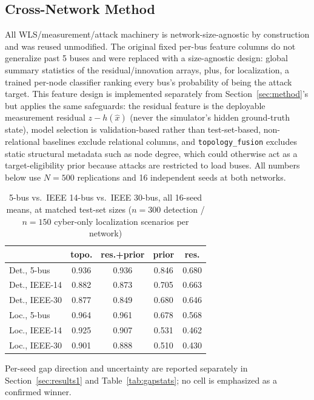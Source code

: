 \documentclass[conference]{IEEEtran}
\begin{document}
\subsection{Cross-Network Method}
All WLS/measurement/attack machinery is network-size-agnostic by construction and was reused unmodified. The original fixed per-bus feature columns do not generalize past 5 buses and were replaced with a size-agnostic design: global summary statistics of the residual/innovation arrays, plus, for localization, a trained per-node classifier ranking every bus's probability of being the attack target. This feature design is implemented separately from Section~\ref{sec:method}'s but applies the same safeguards: the residual feature is the deployable measurement residual $z - h(\hat{x})$ (never the simulator's hidden ground-truth state), model selection is validation-based rather than test-set-based, non-relational baselines exclude relational columns, and \texttt{topology\_fusion} excludes static structural metadata such as node degree, which could otherwise act as a target-eligibility prior because attacks are restricted to load buses. All numbers below use $N{=}500$ replications and 16 independent seeds at both networks.

\begin{table}[t]
\centering
\caption{5-bus vs.\ IEEE 14-bus vs.\ IEEE 30-bus, all 16-seed means, at matched test-set sizes ($n{=}300$ detection / $n{=}150$ cyber-only localization scenarios per network)}
\label{tab:scale}
\footnotesize
\begin{tabular}{@{}lcccc@{}}
\toprule
 & topo. & res.+prior & prior & res. \\
\midrule
Det., 5-bus & 0.936 & 0.936 & 0.846 & 0.680 \\
Det., IEEE-14 & 0.882 & 0.873 & 0.705 & 0.663 \\
Det., IEEE-30 & 0.877 & 0.849 & 0.680 & 0.646 \\
Loc., 5-bus & 0.964 & 0.961 & 0.678 & 0.568 \\
Loc., IEEE-14 & 0.925 & 0.907 & 0.531 & 0.462 \\
Loc., IEEE-30 & 0.901 & 0.888 & 0.510 & 0.430 \\
\bottomrule
\end{tabular}

\smallskip
\footnotesize Per-seed gap direction and uncertainty are reported separately in Section~\ref{sec:results1} and Table~\ref{tab:gapstats}; no cell is emphasized as a confirmed winner.
\end{table}
\end{document}
